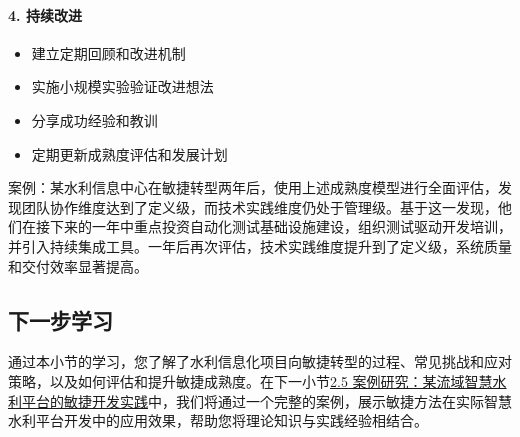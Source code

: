 \paragraph{4. 持续改进}\label{ux6301ux7eedux6539ux8fdb}

\begin{itemize}
\tightlist
\item
  建立定期回顾和改进机制
\item
  实施小规模实验验证改进想法
\item
  分享成功经验和教训
\item
  定期更新成熟度评估和发展计划
\end{itemize}

案例：某水利信息中心在敏捷转型两年后，使用上述成熟度模型进行全面评估，发现团队协作维度达到了定义级，而技术实践维度仍处于管理级。基于这一发现，他们在接下来的一年中重点投资自动化测试基础设施建设，组织测试驱动开发培训，并引入持续集成工具。一年后再次评估，技术实践维度提升到了定义级，系统质量和交付效率显著提高。

\subsection{下一步学习}\label{ux4e0bux4e00ux6b65ux5b66ux4e60}

通过本小节的学习，您了解了水利信息化项目向敏捷转型的过程、常见挑战和应对策略，以及如何评估和提升敏捷成熟度。在下一小节\href{section03-02-05.md}{2.5
案例研究：某流域智慧水利平台的敏捷开发实践}中，我们将通过一个完整的案例，展示敏捷方法在实际智慧水利平台开发中的应用效果，帮助您将理论知识与实践经验相结合。
